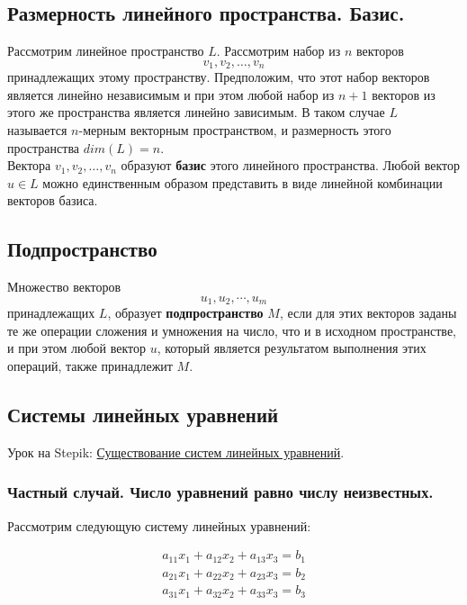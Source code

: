 \documentclass{article}
\begin{document}
\subsection{Размерность линейного пространства. Базис.}

Рассмотрим линейное пространство $L$. Рассмотрим набор из $n$ векторов $$v_1, v_2, \dots, v_n$$ принадлежащих этому пространству. Предположим, что этот набор векторов является линейно независимым и при этом любой набор из $n + 1$ векторов из этого же пространства является линейно зависимым. В таком случае $L$ называется $n$-мерным векторным пространством, и размерность этого пространства $dim(L) = n$. \\

Вектора $v_1, v_2, \dots, v_n$ образуют \textbf{базис} этого линейного пространства. Любой вектор $u \in L$ можно единственным образом представить в виде линейной комбинации векторов базиса. \\

\subsection{Подпространство}

Множество векторов $$u_1, u_2, \cdots, u_m$$ принадлежащих $L$, образует \textbf{подпространство} $M$, если для этих векторов заданы те же операции сложения и умножения на число, что и в исходном пространстве, и при этом любой вектор $u$, который является результатом выполнения этих операций, также принадлежит $M$.

\subsection{Системы линейных уравнений}

Урок на Stepik: \href{https://stepik.org/course/2461/syllabus}{Существование систем линейных уравнений}. \\

\subsubsection{Частный случай. Число уравнений равно числу неизвестных.}

Рассмотрим следующую систему линейных уравнений:

\[ \begin{array}{c}
	a_{11} x_{1} + a_{12} x_2 + a_{13} x_3 = b_1 \\
	a_{21} x_{1} + a_{22} x_2 + a_{23} x_3 = b_2 \\
	a_{31} x_{1} + a_{32} x_2 + a_{33} x_3 = b_3 \\
\end{array} \]
\end{document}
